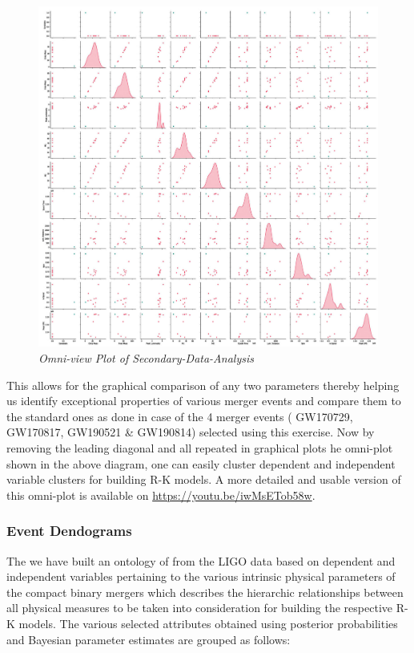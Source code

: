     \begin{figure}[H]
        \centering
        \includegraphics[width=1.0\linewidth]{images/52_09_Seconday-Data-Analysis_OmniView.jpg}
        \caption{\textit{Omni-view Plot of Secondary-Data-Analysis}}
        \label{fig:LIGO6_PlaceHolder_fig}
    \end{figure}

    This allows for the graphical comparison of any two parameters thereby helping us identify exceptional properties of various merger events and compare them to the standard ones as done in case of the 4 merger events ( GW170729, GW170817, GW190521 \& GW190814) selected using this exercise. Now by removing the leading diagonal and all repeated  in graphical plots he omni-plot shown in the above diagram, one can easily cluster dependent and independent variable clusters for building R-K models. A more detailed and usable version of this omni-plot is available on \url{https://youtu.be/iwMsETob58w}.

    \subsubsection{Event Dendograms}

    The we have built an ontology of from the LIGO data based on dependent and independent variables pertaining to the various intrinsic physical parameters of the compact binary mergers which describes the hierarchic relationships between all physical measures to be taken into consideration for building the respective R-K models. The various selected attributes obtained using posterior probabilities and Bayesian parameter estimates are grouped as follows:
   
